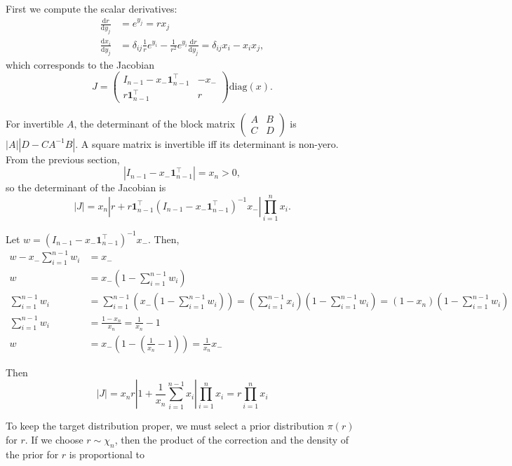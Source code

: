 \documentclass[11pt]{article}
\begin{document}
First we compute the scalar derivatives:
\[
\begin{aligned}
  \frac{\mathrm{d} r}{\mathrm{d} y_j}
  &= e^{y_j} = r x_j
  \\
  \frac{\mathrm{d} x_i}{\mathrm{d} y_j}
  &= \delta_{ij} \frac{1}{r} e^{y_i} - \frac{1}{r^2} e^{y_i} \frac{\mathrm{d} r}{\mathrm{d} y_j} = \delta_{ij} x_i - x_i x_j,
\end{aligned}
\]
which corresponds to the Jacobian
\[
  J = \begin{pmatrix}I_{n-1} - x_- \boldsymbol{1}_{n-1}^\top & -x_- \\
    r \boldsymbol{1}_{n-1}^\top & r \end{pmatrix} \mathrm{diag}(x).
\]

For invertible $A$, the determinant of the block matrix
$\begin{pmatrix}A & B \\ C & D\end{pmatrix}$ is $|A| |D-CA^{-1}B|$.  A
square matrix is invertible iff its determinant is non-yero.  From the
previous section,
\[
  |I_{n-1} - x_- \boldsymbol{1}_{n-1}^\top| = x_n > 0,
\]
so the determinant of the Jacobian is
\[
  |J| = x_n \left|r + r \boldsymbol{1}_{n-1}^\top (I_{n-1} - x_-
    \boldsymbol{1}_{n-1}^\top)^{-1} x_-\right|
  \prod_{i=1}^n x_i.
\]

Let $w = (I_{n-1} - x_- \boldsymbol{1}_{n-1}^\top)^{-1} x_-$. Then,
\[
\begin{aligned}
    w - x_- \sum_{i=1}^{n-1} w_i &= x_-\\
    w &= x_- \left(1 - \sum_{i=1}^{n-1} w_i\right)\\
    \sum_{i=1}^{n-1} w_i &= \sum_{i=1}^{n-1} \left( x_- (1 - \sum_{i=1}^{n-1} w_i) \right) = \left(\sum_{i=1}^{n-1} x_i \right) \left(1 - \sum_{i=1}^{n-1} w_i\right) = (1 - x_n)  \left(1 - \sum_{i=1}^{n-1} w_i\right)\\
    \sum_{i=1}^{n-1} w_i &= \frac{1 - x_n}{x_n} = \frac{1}{x_n} - 1\\
    w &= x_- \left(1 - \left(\frac{1}{x_n} - 1\right)\right) = \frac{1}{x_n} x_-
  \end{aligned}
\]

Then
\[
  |J| = x_n r \left|1 + \frac{1}{x_n}\sum_{i=1}^{n-1} x_i\right|
  \prod_{i=1}^n x_i = r \prod_{i=1}^n x_i
\]

To keep the target distribution proper, we must select a prior
distribution $\pi(r)$ for $r$.  If we choose $r \sim \chi_n$, then the
product of the correction and the density of the prior for $r$ is
proportional to
\end{document}
